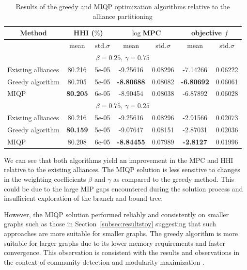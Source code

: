 \documentclass[preprint,times]{elsarticle}
\begin{document}
\begin{table}[h]
\centering
\caption{Results of the greedy and \ac{MIQP} optimization algorithms relative to the alliance partitioning}
\begin{tabular}{|l|cc|cc|cc|}
\hline
\multicolumn{1}{|c|}{\centering\textbf{Method}} 	& \multicolumn{2}{c|}{\textbf{\ac{HHI}} ($\%$)}	& \multicolumn{2}{c|}{\textbf{$\log$\ac{MPC}}} 	& \multicolumn{2}{c|}{\textbf{objective} $f$} 	\\ \hline
~ 													& mean & std.$\sigma$ 							& mean & std.$\sigma$ 							& mean & std.$\sigma$ 							\\ \hline
\multicolumn{7}{|c|}{\centering$\beta=0.25$, $\gamma=0.75$} 																																		\\ \hline
Existing alliances  								& 80.216 & 5e-05								& -9.25616 & 0.08296							& -7.14266 & 0.06222							\\
Greedy algorithm 									& 80.705 & 5e-05								& \textbf{-8.80688} & 0.08082					& \textbf{-6.80692} & 0.06061					\\
\ac{MIQP} 											& \textbf{80.205} & 6e-05						& -8.90454 & 0.08038							& -6.87892 & 0.06028							\\ \hline
\multicolumn{7}{|c|}{\centering$\beta=0.75$, $\gamma=0.25$} 																																		\\ \hline
Existing alliances 									& 80.216 & 5e-05								& -9.25616 & 0.08296							& -2.91566 & 0.02073							\\
Greedy algorithm 									& \textbf{80.159} & 5e-05						& -9.07647 & 0.08151							& -2.87031 & 0.02036							\\
\ac{MIQP} 											& 80.208 & 6e-05								& \textbf{-8.84455} & 0.07989					& \textbf{-2.8127}  & 0.01996					\\
\hline
\end{tabular}
\label{table:results}
\end{table}

We can see that both algorithms yield an improvement in the \ac{MPC} and \ac{HHI} relative to the existing alliances. The \ac{MIQP} solution is less sensitive to changes in the weighting coefficients $\beta$ and $\gamma$ as compared to the greedy method. This could be due to the large \ac{MIP} gaps encountered during the solution process and insufficient exploration of the branch and bound tree.

However, the \ac{MIQP} solution performed reliably and consistently on smaller graphs such as those in Section~\ref{subsec:resultstoy} suggesting that such approaches are more suitable for smaller graphs. The greedy algorithm is more suitable for larger graphs due to its lower memory requirements and faster convergence. This observation is consistent with the results and observations in the context of community detection and modularity maximization \citep{Aref2023}.
\end{document}
